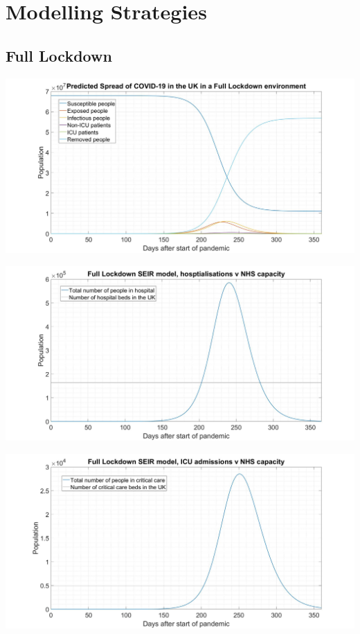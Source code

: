 \documentclass[11pt]{article}
\begin{document}
\section{Modelling Strategies}
\subsection{Full Lockdown}
\begin{center}
\includegraphics[width=1\textwidth]{FLSEIHR.jpg} 
\end{center}
\begin{center}
\includegraphics[width=1\textwidth]{FLH.jpg} 
\end{center}
\begin{center}
\includegraphics[width=1\textwidth]{FLHICU.jpg} 
\end{center}
\end{document}
